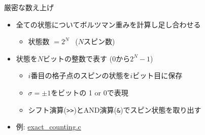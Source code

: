 \begin{frame}[t,fragile]{厳密な数え上げ}
  \begin{itemize}
    \setlength{\itemsep}{1em}
  \item 全ての状態についてボルツマン重みを計算し足し合わせる
    \begin{itemize}
    \item 状態数 $= 2^N$ \ ($N$スピン数)
    \end{itemize}
  \item 状態を$N$ビットの整数で表す (0から$2^N-1$)
    \begin{itemize}
    \item $i$番目の格子点のスピンの状態を$i$ビット目に保存
    \item $\sigma = \pm 1$をビットの 1 or 0で表現
    \item シフト演算(\verb+>>+)とAND演算(\verb+&+)でスピン状態を取り出す
    \end{itemize}
  \item 例: \href{https://github.com/todo-group/computer-experiments/blob/master/exercise/monte_carlo/exact_counting.c}{exact\_counting.c}
  \end{itemize}
\end{frame}
